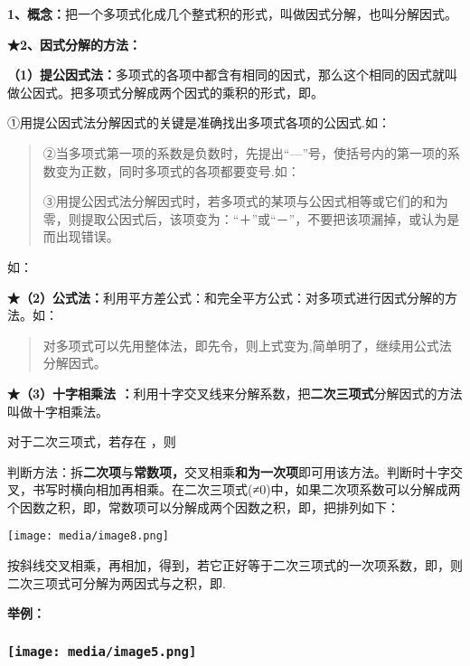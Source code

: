 \documentclass[a4paper,11pt,UTF8]{ctexart}
\begin{document}
\textbf{1、概念：}把一个多项式化成几个整式积的形式，叫做因式分解，也叫分解因式。

\textbf{★2、因式分解的方法：}

\textbf{（1）提公因式法：}多项式的各项中都含有相同的因式，那么这个相同的因式就叫做公因式。把多项式分解成两个因式的乘积的形式，即。

①用提公因式法分解因式的关键是准确找出多项式各项的公因式.如：

\begin{quote}
②当多项式第一项的系数是负数时，先提出``---''号，使括号内的第一项的系数变为正数，同时多项式的各项都要变号.如：

③用提公因式法分解因式时，若多项式的某项与公因式相等或它们的和为零，则提取公因式后，该项变为：``＋''或``－''，不要把该项漏掉，或认为是而出现错误。
\end{quote}

如：

\textbf{★（2）公式法：}利用平方差公式：和完全平方公式：对多项式进行因式分解的方法。如：

\begin{quote}
对多项式可以先用整体法，即先令，则上式变为,简单明了，继续用公式法分解因式。
\end{quote}

\textbf{★（3）十字相乘法
：}利用十字交叉线来分解系数，把\textbf{二次三项式}分解因式的方法叫做十字相乘法。

对于二次三项式，若存在 ，则

判断方法：拆\textbf{二次项}与\textbf{常数项，}交叉相乘\textbf{和为一次项}即可用该方法。判断时十字交叉，书写时横向相加再相乘。在二次三项式(≠0)中，如果二次项系数可以分解成两个因数之积，即，常数项可以分解成两个因数之积，即，把排列如下：

\texttt{[image: media/image8.png]}

按斜线交叉相乘，再相加，得到，若它正好等于二次三项式的一次项系数，即，则二次三项式可分解为两因式与之积，即.

\textbf{举例：}

\hypertarget{ux5b66ux79d1ux7f51www.zxxk.com--ux6559ux80b2ux8d44ux6e90ux95e8ux6237ux63d0ux4f9bux8bd5ux9898ux8bd5ux5377ux6559ux6848ux8bfeux4ef6ux6559ux5b66ux8bbaux6587ux7d20ux6750ux7b49ux5404ux7c7bux6559ux5b66ux8d44ux6e90ux5e93ux4e0bux8f7dux8fd8ux6709ux5927ux91cfux4e30ux5bccux7684ux6559ux5b66ux8d44ux8baf-4}{%
\subsubsection{\texorpdfstring{\protect\texttt{[image: media/image5.png]}}{学科网(www.zxxk.com)-\/-教育资源门户，提供试题试卷、教案、课件、教学论文、素材等各类教学资源库下载，还有大量丰富的教学资讯！}}\label{ux5b66ux79d1ux7f51www.zxxk.com--ux6559ux80b2ux8d44ux6e90ux95e8ux6237ux63d0ux4f9bux8bd5ux9898ux8bd5ux5377ux6559ux6848ux8bfeux4ef6ux6559ux5b66ux8bbaux6587ux7d20ux6750ux7b49ux5404ux7c7bux6559ux5b66ux8d44ux6e90ux5e93ux4e0bux8f7dux8fd8ux6709ux5927ux91cfux4e30ux5bccux7684ux6559ux5b66ux8d44ux8baf-4}}
\end{document}
